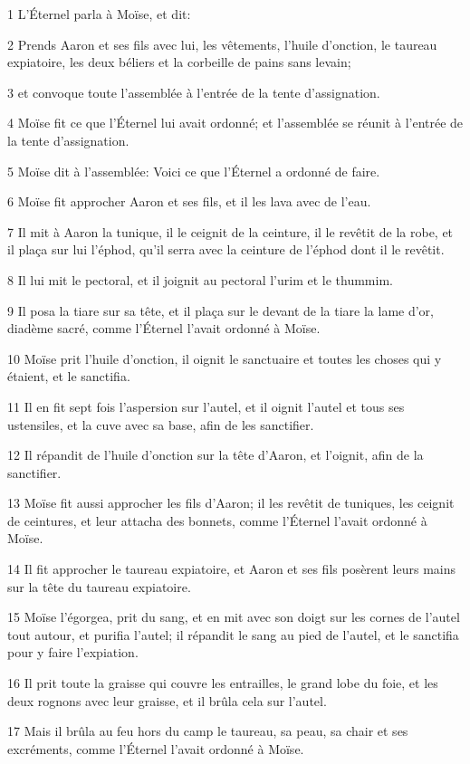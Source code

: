 \par 1 L'Éternel parla à Moïse, et dit:
\par 2 Prends Aaron et ses fils avec lui, les vêtements, l'huile d'onction, le taureau expiatoire, les deux béliers et la corbeille de pains sans levain;
\par 3 et convoque toute l'assemblée à l'entrée de la tente d'assignation.
\par 4 Moïse fit ce que l'Éternel lui avait ordonné; et l'assemblée se réunit à l'entrée de la tente d'assignation.
\par 5 Moïse dit à l'assemblée: Voici ce que l'Éternel a ordonné de faire.
\par 6 Moïse fit approcher Aaron et ses fils, et il les lava avec de l'eau.
\par 7 Il mit à Aaron la tunique, il le ceignit de la ceinture, il le revêtit de la robe, et il plaça sur lui l'éphod, qu'il serra avec la ceinture de l'éphod dont il le revêtit.
\par 8 Il lui mit le pectoral, et il joignit au pectoral l'urim et le thummim.
\par 9 Il posa la tiare sur sa tête, et il plaça sur le devant de la tiare la lame d'or, diadème sacré, comme l'Éternel l'avait ordonné à Moïse.
\par 10 Moïse prit l'huile d'onction, il oignit le sanctuaire et toutes les choses qui y étaient, et le sanctifia.
\par 11 Il en fit sept fois l'aspersion sur l'autel, et il oignit l'autel et tous ses ustensiles, et la cuve avec sa base, afin de les sanctifier.
\par 12 Il répandit de l'huile d'onction sur la tête d'Aaron, et l'oignit, afin de la sanctifier.
\par 13 Moïse fit aussi approcher les fils d'Aaron; il les revêtit de tuniques, les ceignit de ceintures, et leur attacha des bonnets, comme l'Éternel l'avait ordonné à Moïse.
\par 14 Il fit approcher le taureau expiatoire, et Aaron et ses fils posèrent leurs mains sur la tête du taureau expiatoire.
\par 15 Moïse l'égorgea, prit du sang, et en mit avec son doigt sur les cornes de l'autel tout autour, et purifia l'autel; il répandit le sang au pied de l'autel, et le sanctifia pour y faire l'expiation.
\par 16 Il prit toute la graisse qui couvre les entrailles, le grand lobe du foie, et les deux rognons avec leur graisse, et il brûla cela sur l'autel.
\par 17 Mais il brûla au feu hors du camp le taureau, sa peau, sa chair et ses excréments, comme l'Éternel l'avait ordonné à Moïse.
